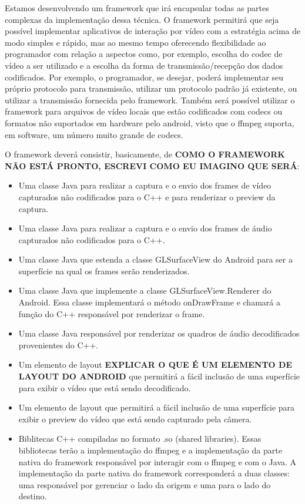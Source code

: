 \documentclass{acm_proc_article-sp}
\newcommand{\todo}[1]{\textcolor[rgb]{1.00,0.00,0.00}{\bf \uppercase{#1}}}
\begin{document}
Estamos desenvolvendo um framework que irá encapsular todas as partes complexas da implementação dessa técnica. O framework permitirá que seja possível implementar aplicativos de interação por vídeo com a estratégia acima de modo simples e rápido, mas ao mesmo tempo oferecendo flexibilidade ao programador com relação a aspectos como, por exemplo, escolha do codec de vídeo a ser utilizado e a escolha da forma de transmissão/recepção dos dados codificados. Por exemplo, o programador, se desejar, poderá implementar seu próprio protocolo para transmissão, utilizar um protocolo padrão já existente, ou utilizar a transmissão fornecida pelo framework. Também será possível utilizar o framework para arquivos de vídeo locais que estão codificados com codecs ou formatos não suportados em hardware pelo android, visto que o ffmpeg suporta, em software, um número muito grande de codecs.

O framework deverá consistir, basicamente, de \todo{como o framework não está pronto, escrevi como eu imagino que será}:

\begin{itemize}
 \item Uma classe Java para realizar a captura e o envio dos frames de vídeo capturados não codificados para o C++ e para renderizar o preview da captura.
 \item Uma classe Java para realizar a captura e o envio dos frames de áudio capturados não codificados para o C++.
 \item Uma classe Java que estenda a classe GLSurfaceView do Android para ser a superfície na qual os frames serão renderizados.
 \item Uma classe Java que implemente a classe GLSurfaceView.Renderer do Android. Essa classe implementará o método onDrawFrame e chamará a função do C++ responsável por renderizar o frame.
 \item Uma classe Java responsável por renderizar os quadros de áudio decodificados provenientes do C++.
 \item Um elemento de layout \todo{explicar o que é um elemento de layout do android} que permitirá a fácil inclusão de uma superfície para exibir o vídeo que está sendo decodificado.
 \item Um elemento de layout que permitirá a fácil inclusão de uma superfície para exibir o preview do vídeo que está sendo capturado pela câmera.
 \item Biblitecas C++ compiladas no formato .so (shared libraries). Essas bibliotecas terão a implementação do ffmpeg e a implementação da parte nativa do framework responsável por interagir com o ffmpeg e com o Java. A implementação da parte nativa do framework corresponderá a duas classes: uma responsável por gerenciar o lado da origem e uma para o lado do destino.
\end{itemize}
\end{document}
